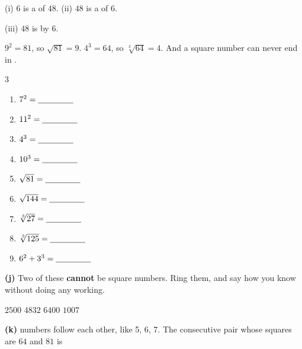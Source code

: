\documentclass[12pt,a4paper]{article}
\begin{document}
\vspace{7pt}
\noindent\hspace*{1.2em}(i) $6$ is a \blank[3.2cm] of $48$. \qquad
(ii) $48$ is a \blank[3.2cm] of $6$.

\vspace{8pt}
\noindent\hspace*{1.2em}(iii) $48$ is \blank[3.2cm] by $6$.


\begin{remember}
  $9^2 = 81$, so $\sqrt{81} = 9$. \quad $4^3 = 64$, so $\sqrt[3]{64} = 4$. \quad And a
  square number can never end in .
\end{remember}

\vspace{2pt}
\begin{multicols}{3}
\begin{enumerate}[label=(\alph*), itemsep=13pt]
  \item $7^2 = \blank[1.5cm]$
  \item $11^2 = \blank[1.5cm]$
  \item $4^3 = \blank[1.5cm]$
  \item $10^3 = \blank[1.5cm]$
  \item $\sqrt{81} = \blank[1.5cm]$
  \item $\sqrt{144} = \blank[1.5cm]$
  \item $\sqrt[3]{27} = \blank[1.5cm]$
  \item $\sqrt[3]{125} = \blank[1.5cm]$
  \item $6^2 + 3^3 = \blank[1.5cm]$
\end{enumerate}
\end{multicols}

\vspace{6pt}
\noindent\textbf{(j)} Two of these \textbf{cannot} be square numbers. Ring them, and
say how you know without doing any working.

\vspace{9pt}
\noindent\hspace*{1.2em}$2500$ \qquad $4832$ \qquad $6400$ \qquad $1007$

\vspace{2pt}
\noindent\textbf{(k)}  numbers follow each other, like 5, 6, 7. The
consecutive pair whose squares are $64$ and $81$ is \blank[2.6cm]
\end{document}

